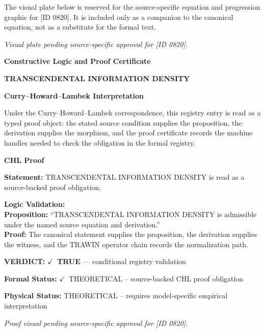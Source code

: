 \begingroup\footnotesize\sloppy
The visual plate below is reserved for the source-specific equation and progression graphic for [ID 0820]. It is included only as a companion to the canonical equation, not as a substitute for the formal text.
\par\endgroup
\begingroup\footnotesize\itshape
Visual plate pending source-specific approval for [ID 0820].
\par\endgroup

\clearpage
\begingroup\tzpsupportsetup
\noindent\textbf{\fontsize{10.8pt}{12.8pt}\selectfont [ID 0820] Constructive Logic and Proof Certificate}\par
\noindent\textbf{\fontsize{10pt}{12pt}\selectfont TRANSCENDENTAL INFORMATION DENSITY}\par
\vspace{0.45em}
\begingroup
\footnotesize
\setlength{\parskip}{0.22em}
\setlength{\parindent}{0pt}
\noindent\textbf{Curry--Howard--Lambek Interpretation}\par
Under the Curry--Howard--Lambek correspondence, this registry entry is read as a typed proof
object: the stated source condition supplies the proposition, the derivation supplies the
morphism, and the proof certificate records the machine handles needed to check the obligation
in the formal registry.

\vspace{0.45em}
\noindent\textbf{CHL Proof}\par
\textbf{Statement:} TRANSCENDENTAL INFORMATION DENSITY is read as a source-backed proof obligation.

\textbf{Logic Validation:}\\
\textbf{Proposition:} ``TRANSCENDENTAL INFORMATION DENSITY is admissible under the named source equation and derivation.''\\
\textbf{Proof:} The canonical statement supplies the proposition, the derivation supplies the witness, and the TRAWIN operator chain records the normalization path.

\textbf{VERDICT:} \ensuremath{\checkmark}\ \textbf{TRUE} --- conditional registry validation

\textbf{Formal Status:} \ensuremath{\checkmark}\ THEORETICAL -- source-backed CHL proof obligation

\textbf{Physical Status:} THEORETICAL -- requires model-specific empirical interpretation
\par\vspace{0.45em}
\par
\vfill
\begingroup\footnotesize\itshape
Proof visual pending source-specific approval for [ID 0820].
\par\endgroup
\vfill
\endgroup
\endgroup
